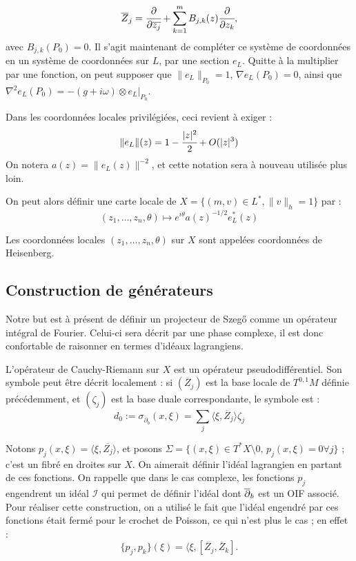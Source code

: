 \begin{equation*}
	\overline{Z}_j = \cfrac{\partial}{\partial \overline{z_j}} + \sum_{k=1}^mB_{j,k}(z)\cfrac{\partial}{\partial z_k},
\end{equation*}
avec $B_{j,k}(P_0)=0$.
Il s'agit maintenant de compléter ce système de coordonnées en un système de coordonnées sur $L$, par une section $e_L$. Quitte à la multiplier par une fonction, on peut supposer que  $\|e_L\|_{P_0}=1$, $\nabla e_L(P_0)=0$, ainsi que $\nabla^2e_L(P_0)=-(g+i\omega)\otimes e_L|_{P_0}$.

Dans les coordonnées locales privilégiées, ceci revient à exiger :
\begin{equation*}
\|e_L\|(z)=1-\cfrac{|z|^2}{2} + O(|z|^3)
\end{equation*}
On notera $a(z)=\|e_L(z)\|^{-2}$, et cette notation sera à nouveau utilisée plus loin.

On peut alors définir une carte locale de $X = \{(m,v)\in L^*, \|v\|_h=1 \}$ par :
\begin{equation*}
(z_1, \ldots, z_n, \theta) \mapsto e^{i\theta}a(z)^{-1/2}e_L^*(z)
\end{equation*}

Les coordonnées locales $(z_1, \ldots, z_n, \theta)$ sur $X$ sont appelées coordonnées de Heisenberg.
 
\subsection{Construction de générateurs}

Notre but est à présent de définir un projecteur de Szeg\H{o} comme un opérateur intégral de Fourier. Celui-ci sera décrit par une phase complexe, il est donc confortable de raisonner en termes d'idéaux lagrangiens. 

L'opérateur de Cauchy-Riemann sur $X$ est un opérateur pseudodifférentiel. Son symbole peut être décrit localement : si $(\overline{Z}_j)$ est la base locale de $T^{0,1}M$ définie précédemment, et $(\zeta_j)$ est la base duale correspondante, le symbole est :
\begin{equation*}
	d_0 := \sigma_{\overline{\partial}_b}(x,\xi) = \sum_{j} \langle \xi, \overline{Z}_j \rangle \zeta_j
\end{equation*}

Notons $p_j(x,\xi)= \langle \xi, \overline{Z_j} \rangle$, et posons $\Sigma = \{(x,\xi) \in T^*X\setminus 0,\,p_j(x,\xi)=0 \forall j\}$ ; c'est un fibré en droites sur $X$. On aimerait définir l'idéal lagrangien en partant de ces fonctions. On rappelle que dans le cas complexe, les fonctions $p_j$ engendrent un idéal $\mathcal{I}$ qui permet de définir l'idéal dont $\overline{\partial}_b$ est un OIF associé. Pour réaliser cette construction, on a utilisé le fait que l'idéal engendré par ces fonctions était fermé pour le crochet de Poisson, ce qui n'est plus le cas ; en effet :
\begin{equation*}
	\{p_j,p_k\}(\xi) = \langle \xi, [\overline{Z}_j,\overline{Z}_k].
\end{equation*}

